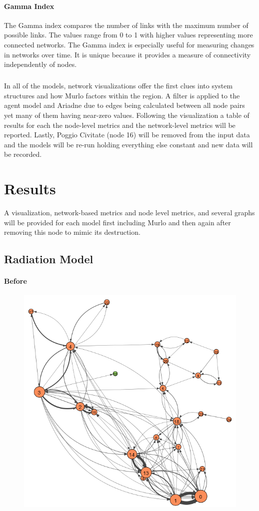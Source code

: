 \documentclass[12pt,a4paper]{thesis}
\begin{document}
\subsubsection{Gamma Index}
The Gamma index compares the number of links with the maximum number of possible links. The values range from 0 to 1 with higher values representing more connected networks. The Gamma index is especially useful for measuring changes in networks over time. It is unique because it provides a measure of connectivity independently of nodes.



\paragraph{}	
In all of the models, network visualizations offer the first clues into system structures and how Murlo factors within the region. A filter is applied to the agent model and Ariadne due to edges being calculated between all node pairs yet many of them having near-zero values. Following the visualization a table of results for each the node-level metrics and the network-level metrics will be reported. Lastly, Poggio Civitate (node 16) will be removed from the input data and the models will be re-run holding everything else constant and new data will be recorded. 



\chapter{Results}
A visualization, network-based metrics and node level metrics, and several graphs will be provided for each model first including Murlo and then again after removing this node to mimic its destruction.


\section{Radiation Model}
\subsubsection{Before}

\begin{figure}[H]
\centering
\includegraphics[width=0.35\linewidth]{./BeforeViz/radModel}
\caption{}
\label{fig:radModelBefore}
\end{figure}
\end{document}
